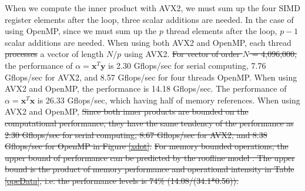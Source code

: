 \documentclass{IOS-Book-Article}
\begin{document}
{When we compute the inner product with AVX2, we must sum up the four SIMD register elements after the loop, three scalar additions are needed.
In the case of using OpenMP, since we must sum up the $p$ thread elements after the loop, $p-1$ scalar additions are needed.
When using both AVX2 and OpenMP, each thread \sout{processes} {\color{mid}{compute a partial sum with}} a vector of length $N/p$ using AVX2. {} {}{\color{mur}{Then, this partial sums are computed to groval sum.}}
\sout{For vector of order $N$ = 4,096,000,} {} the performance of $\alpha  = \bm{x}^T\bm{y}$ is 2.30 Gflops/sec for serial computing, 7.76 Gflops/sec for AVX2, and 8.57 Gflops/sec for four threads OpenMP. When using AVX2 and OpenMP, the performance is 14.18 Gflops/sec.
The performance of $\alpha = \bm{x}^T\bm{x}$ is 26.33 Gflops/sec, which having half of memory references. 
When using AVX2 and OpenMP, {\color{mur}{the computational process is faster than data supply process, so the number of memory references is the problem.}} {}
\sout{Since both inner products are bounded on the computational performance, they have the same tendency of the performance as 2.30 Gflops/sec for serial computing, 8.67 Gflops/sec for AVX2, and 8.38 Gflops/sec for OpenMP in Figure \ref{xdot}.}{}
\sout{For memory bounded operations, the upper bound of performance can be predicted by the roofline model \cite{roof}. The upper bound is the product of memory performance and operational intensity in Table \ref{opeData}, i.e. the performance levels is 74\% (14.08/(34.1*0.56)).} {\color{mid}{The performance for using AVX2 and OpenMP is 74\% (14.18/(34.1*0.56)) of the upper bound of performance. (内積の段落。長いから表からわかる数値は改めて書かずに済むような文章に書き換える？)}}

}
\end{document}
